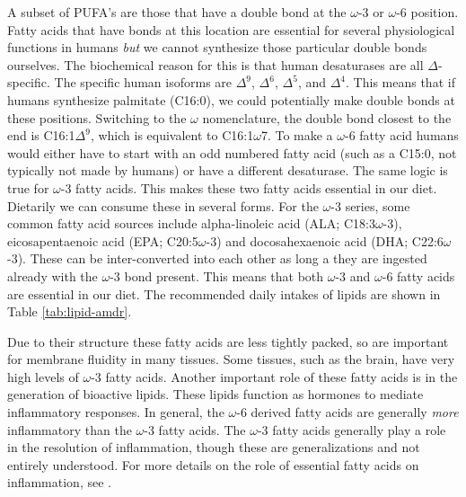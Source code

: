 \documentclass{tufte-handout}
\begin{document}
A subset of PUFA's are those that have a double bond at the $\omega$-3 or $\omega$-6 position.  Fatty acids that have bonds at this location are essential for several physiological functions in humans \emph{but} we cannot synthesize those particular double bonds ourselves.  The biochemical reason for this is that human desaturases are all $\Delta$-specific.  The specific human isoforms are $\Delta^9$, $\Delta^6$, $\Delta^5$, and $\Delta^4$.  This means that if humans synthesize palmitate (C16:0), we could potentially make double bonds at these positions.  Switching to the $\omega$ nomenclature, the double bond closest to the end is C16:1$\Delta^9$, which is equivalent to C16:1$\omega$7.  To make a $\omega$-6 fatty acid humans would either have to start with an odd numbered fatty acid (such as a C15:0, not typically not made by humans) or have a different desaturase.  The same logic is true for $\omega$-3 fatty acids.  This makes these two fatty acids essential in our diet.  Dietarily we can consume these in several forms.  For the $\omega$-3 series, some common fatty acid sources include alpha-linoleic acid (ALA; C18:3$\omega$-3), eicosapentaenoic acid (EPA; C20:5$\omega$-3) and docosahexaenoic acid (DHA; C22:6$\omega$-3).  These can be inter-converted into each other as long a they are ingested already with the $\omega$-3 bond present.  This means that both $\omega$-3  and $\omega$-6 fatty acids are essential in our diet.  The recommended daily intakes of lipids are shown in Table \ref{tab:lipid-amdr}.

  Due to their structure these fatty acids are less tightly packed, so are important for membrane fluidity in many tissues.  Some tissues, such as the brain, have very high levels of $\omega$-3 fatty acids.  Another important role of these fatty acids is in the generation of bioactive lipids.  These lipids function as hormones to mediate inflammatory responses.  In general, the $\omega$-6 derived fatty acids are generally \emph{more} inflammatory than the $\omega$-3 fatty acids.  The $\omega$-3 fatty acids generally play a role in the resolution of inflammation, though these are generalizations and not entirely understood.  For more details on the role of essential fatty acids on inflammation, see \citet{Calder2013}.  
\end{document}
